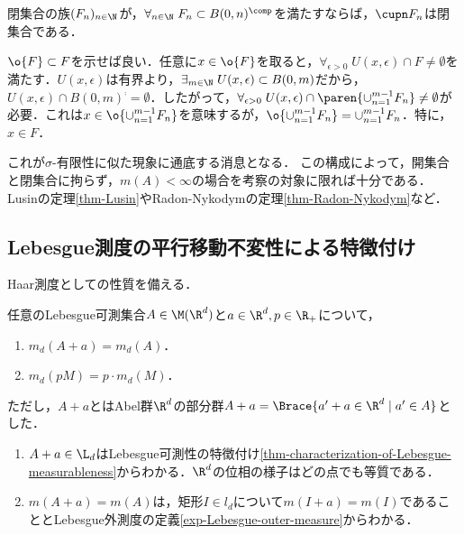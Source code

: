 \documentclass[uplatex, dvipdfmx]{jsreport}
\begin{document}
\begin{lemma}[位相空間論の補足]\label{lemma-general-topology}
    閉集合の族$(F_n)_{n\in\N}$が，$\forall_{n\in\N}\;F_n\subset B(0,n)^\comp$を満たすならば，$\cupn F_n$は閉集合である．
\end{lemma}
\begin{Proof}
    $\o{F}\subset F$を示せば良い．任意に$x\in\o{F}$を取ると，$\forall_{\epsilon>0}\;U(x,\epsilon)\cap F\ne\emptyset$を満たす．$U(x,\epsilon)$は有界より，$\exists_{m\in\N}\;U(x,\epsilon)\subset B(0,m)$だから，$U(x,\epsilon)\cap B(0,m)^\comp=\emptyset$．したがって，$\forall_{\epsilon>0}\;U(x,\epsilon)\cap\paren{\cup_{n=1}^{m-1}F_n}\ne\emptyset$が必要．これは$x\in\o{\cup_{n=1}^{m-1}F_n}$を意味するが，$\o{\cup_{n=1}^{m-1}F_n}=\cup_{n=1}^{m-1}F_n$．特に，$x\in F$．
\end{Proof}
\begin{remarks}
    これが$\sigma$-有限性に似た現象に通底する消息となる．
    この構成によって，開集合と閉集合に拘らず，$m(A)<\infty$の場合を考察の対象に限れば十分である．
    Lusinの定理\ref{thm-Lusin}やRadon-Nykodymの定理\ref{thm-Radon-Nykodym}など．
\end{remarks}

\subsection{Lebesgue測度の平行移動不変性による特徴付け}

\begin{tcolorbox}[colframe=ForestGreen, colback=ForestGreen!10!white,breakable,colbacktitle=ForestGreen!40!white,coltitle=black,fonttitle=\bfseries\sffamily,
    title=]
    Haar測度としての性質を備える．
\end{tcolorbox}

\begin{lemma}[Lebesgue測度の線形性]\label{lemma-invariability-of-Lebesgue-measure-under-parallel-transport}
    任意のLebesgue可測集合$A\in\M(\R^d)$と$a\in\R^d,p\in\R_+$について，
    \begin{enumerate}
        \item $m_d(A+a)=m_d(A)$．
        \item $m_d(pM)=p\cdot m_d(M)$．
    \end{enumerate}
    ただし，$A+a$とはAbel群$\R^d$の部分群$A+a=\Brace{a'+a\in\R^d\mid a'\in A}$とした．
\end{lemma}
\begin{Proof}\mbox{}
    \begin{enumerate}
        \item $A+a\in\L_d$はLebesgue可測性の特徴付け\ref{thm-characterization-of-Lebesgue-measurableness}からわかる．$\R^d$の位相の様子はどの点でも等質である．
        \item $m(A+a)=m(A)$は，矩形$I\in l_d$について$m(I+a)=m(I)$であることとLebesgue外測度の定義\ref{exp-Lebesgue-outer-measure}からわかる．
    \end{enumerate}
\end{Proof}
\end{document}
